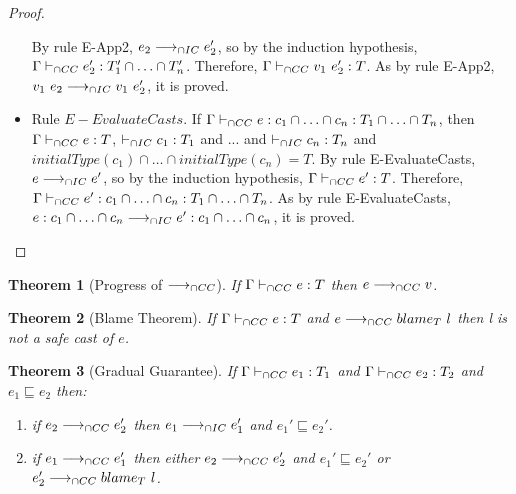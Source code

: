 \documentclass[a4paper]{article}
\newtheorem{theorem}{Theorem}
\begin{document}
\begin{proof}
\begin{itemize}
    By rule E-App2, $e_2 \longrightarrow_{\cap IC} e_2'$, so by the induction hypothesis, $\Gamma \vdash_{\cap CC} e_2' : T_1' \cap \ldots \cap T_n'$.
    Therefore, $\Gamma \iccts v_1\ e_2' : T$.
    As by rule E-App2, $v_1\ e_2 \longrightarrow_{\cap IC} v_1\ e_2'$, it is proved.
    \item Rule $E{-}EvaluateCasts$. If $\Gamma \vdash_{\cap CC} e : c_1 \cap \ldots \cap c_n : T_1 \cap \ldots \cap T_n$, then $\Gamma \vdash_{\cap CC} e : T$, $\vdash_{\cap IC} c_1 : T_1$ and ... and $\vdash_{\cap IC} c_n : T_n$ and $initialType(c_1) \cap \ldots \cap initialType(c_n) = T$.
    By rule E-EvaluateCasts, $e \longrightarrow_{\cap IC} e'$, so by the induction hypothesis, $\Gamma \vdash_{\cap CC} e' : T$.
    Therefore, $\Gamma \vdash_{\cap CC} e' : c_1 \cap \ldots \cap c_n : T_1 \cap \ldots \cap T_n$.
    As by rule E-EvaluateCasts, $e : c_1 \cap \ldots \cap c_n \longrightarrow_{\cap IC} e' : c_1 \cap \ldots \cap c_n$, it is proved.
\end{itemize}
\end{proof}

\begin{theorem}[Progress of $\longrightarrow_{\cap CC}$]
\label{progress}
If $\Gamma \vdash_{\cap CC} e : T$ then $e \longrightarrow_{\cap CC} v$.
\end{theorem}

\begin{theorem}[Blame Theorem]
\label{blame_theorem}
If $\Gamma \vdash_{\cap CC} e : T$ and $e \longrightarrow_{\cap CC} blame_{T}\ l$ then l is not a safe cast of $e$.
\end{theorem}

\begin{theorem}[Gradual Guarantee]
\label{gradual_guarantee}
If $\Gamma \vdash_{\cap CC} e_1 : T_1$ and $\Gamma \vdash_{\cap CC} e_2 : T_2$ and $e_1 \sqsubseteq e_2$ then:
\begin{enumerate}
    \item if $e_2 \longrightarrow_{\cap CC} e_2'$ then $e_1 \longrightarrow_{\cap IC} e_1'$ and $e_1' \sqsubseteq e_2'$.
    \item if $e_1 \longrightarrow_{\cap CC} e_1'$ then either $e_2 \longrightarrow_{\cap CC} e_2'$ and $e_1' \sqsubseteq e_2'$ or $e_2' \longrightarrow_{\cap CC} blame_{T}\ l$.
\end{enumerate}
\end{theorem}



\end{document}
